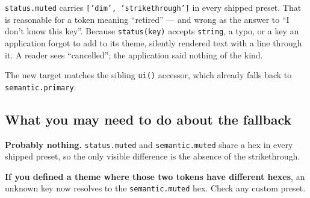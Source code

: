 \texttt{s\allowbreak{}t\allowbreak{}a\allowbreak{}t\allowbreak{}u\allowbreak{}s\allowbreak{}.\allowbreak{}m\allowbreak{}u\allowbreak{}t\allowbreak{}e\allowbreak{}d} carries \texttt{[\allowbreak{}'\allowbreak{}d\allowbreak{}i\allowbreak{}m\allowbreak{}'\allowbreak{},\allowbreak{} \allowbreak{}'\allowbreak{}s\allowbreak{}t\allowbreak{}r\allowbreak{}i\allowbreak{}k\allowbreak{}e\allowbreak{}t\allowbreak{}h\allowbreak{}r\allowbreak{}o\allowbreak{}u\allowbreak{}g\allowbreak{}h\allowbreak{}'\allowbreak{}]} in every shipped preset. That is reasonable for a token meaning ``retired'' --- and wrong as the answer to ``I don't know this key''. Because \texttt{s\allowbreak{}t\allowbreak{}a\allowbreak{}t\allowbreak{}u\allowbreak{}s\allowbreak{}(\allowbreak{}k\allowbreak{}e\allowbreak{}y\allowbreak{})} accepts \texttt{s\allowbreak{}t\allowbreak{}r\allowbreak{}i\allowbreak{}n\allowbreak{}g}, a typo, or a key an application forgot to add to its theme, silently rendered text with a line through it. A reader sees ``cancelled''; the application said nothing of the kind.

The new target matches the sibling \texttt{u\allowbreak{}i\allowbreak{}(\allowbreak{})} accessor, which already falls back to \texttt{s\allowbreak{}e\allowbreak{}m\allowbreak{}a\allowbreak{}n\allowbreak{}t\allowbreak{}i\allowbreak{}c\allowbreak{}.\allowbreak{}p\allowbreak{}r\allowbreak{}i\allowbreak{}m\allowbreak{}a\allowbreak{}r\allowbreak{}y}.

\subsection{What you may need to do about the fallback}\label{record-273-what-you-may-need-to-do-about-the-fallback}

\textbf{Probably nothing.} \texttt{s\allowbreak{}t\allowbreak{}a\allowbreak{}t\allowbreak{}u\allowbreak{}s\allowbreak{}.\allowbreak{}m\allowbreak{}u\allowbreak{}t\allowbreak{}e\allowbreak{}d} and \texttt{s\allowbreak{}e\allowbreak{}m\allowbreak{}a\allowbreak{}n\allowbreak{}t\allowbreak{}i\allowbreak{}c\allowbreak{}.\allowbreak{}m\allowbreak{}u\allowbreak{}t\allowbreak{}e\allowbreak{}d} share a hex in every shipped preset, so the only visible difference is the absence of the strikethrough.

\textbf{If you defined a theme where those two tokens have different hexes}, an unknown key now resolves to the \texttt{s\allowbreak{}e\allowbreak{}m\allowbreak{}a\allowbreak{}n\allowbreak{}t\allowbreak{}i\allowbreak{}c\allowbreak{}.\allowbreak{}m\allowbreak{}u\allowbreak{}t\allowbreak{}e\allowbreak{}d} hex. Check any custom preset.

